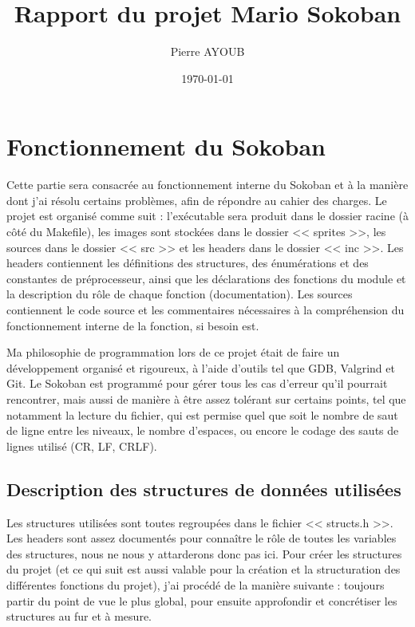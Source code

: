 \documentclass[11pt]{article}
\title{Rapport du projet Mario Sokoban}
\author{Pierre AYOUB}
\date\today
\begin{document}
\maketitle

\section{Fonctionnement du Sokoban}

Cette partie sera consacrée au fonctionnement interne du Sokoban et à la manière
dont j'ai résolu certains problèmes, afin de répondre au cahier des charges.  Le
projet est organisé comme suit : l'exécutable sera produit dans le dossier
racine (à côté du Makefile), les images sont stockées dans le dossier << sprites
>>, les sources dans le dossier << src >> et les headers dans le dossier << inc
>>.  Les headers contiennent les définitions des structures, des énumérations et
des constantes de préprocesseur, ainsi que les déclarations des fonctions du
module et la description du rôle de chaque fonction (documentation).  Les
sources contiennent le code source et les commentaires nécessaires à la
compréhension du fonctionnement interne de la fonction, si besoin est.

Ma philosophie de programmation lors de ce projet était de faire un
développement organisé et rigoureux, à l'aide d'outils tel que GDB, Valgrind et
Git. Le Sokoban est programmé pour gérer tous les cas d'erreur qu'il pourrait
rencontrer, mais aussi de manière à être assez tolérant sur certains points, tel
que notamment la lecture du fichier, qui est permise quel que soit le nombre de
saut de ligne entre les niveaux, le nombre d'espaces, ou encore le codage des
sauts de lignes utilisé (CR, LF, CRLF).

\subsection{Description des structures de données utilisées}

Les structures utilisées sont toutes regroupées dans le fichier << structs.h >>.
Les headers sont assez documentés pour connaître le rôle de toutes les variables
des structures, nous ne nous y attarderons donc pas ici.  Pour créer les
structures du projet (et ce qui suit est aussi valable pour la création et la
structuration des différentes fonctions du projet), j'ai procédé de la manière
suivante : toujours partir du point de vue le plus global, pour ensuite
approfondir et concrétiser les structures au fur et à mesure.
\end{document}
